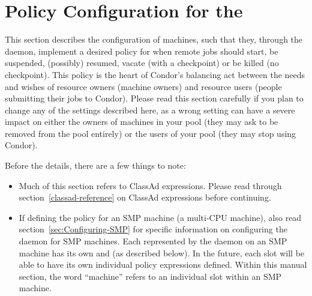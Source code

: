 \section{\label{sec:Configuring-Policy}Policy Configuration for the }

This section describes the configuration of machines,
such that they,
through the  daemon,
implement a desired policy for when remote jobs should start, be
suspended, (possibly) resumed, vacate (with a checkpoint) or be killed
(no checkpoint).
This policy is the heart of Condor's balancing act
between the needs and wishes of resource owners (machine owners) and
resource users (people submitting their jobs to Condor).
Please read
this section carefully if you plan to change any of the settings
described here, as a wrong setting can have a severe impact on
either the owners of machines in your pool (they may
ask to be removed from the pool entirely) or the users of your pool
(they may stop using Condor).

Before the details, there are a few things to note:
\begin{itemize}
\item Much of this section refers to ClassAd expressions.
Please read through section~\ref{classad-reference} on
ClassAd expressions before continuing.

\item If defining the policy for an SMP machine
(a multi-CPU machine),
also read section~\ref{sec:Configuring-SMP} for specific information on
configuring the  daemon for SMP machines.  
Each  represented by the  daemon on an
SMP machine has its own  and 
(as described below). 
In the future, each slot will be able to have its
own individual policy expressions defined.
Within this manual section, the word ``machine''
refers to an individual slot within
an SMP machine.
\end{itemize}

